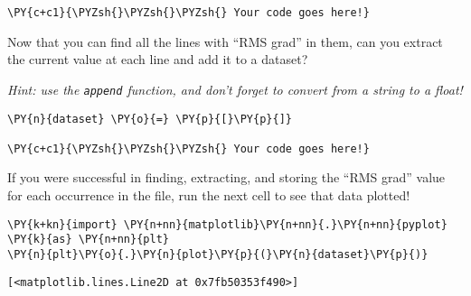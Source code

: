     \begin{tcolorbox}[breakable, size=fbox, boxrule=1pt, pad at break*=1mm,colback=cellbackground, colframe=cellborder]
\begin{Verbatim}[commandchars=\\\{\}]
\PY{c+c1}{\PYZsh{}\PYZsh{}\PYZsh{} Your code goes here!}
\end{Verbatim}
\end{tcolorbox}

    Now that you can find all the lines with ``RMS grad'' in them, can you
extract the current value at each line and add it to a dataset?

\emph{Hint: use the \texttt{append} function, and don't forget to
convert from a string to a float!}

    \begin{tcolorbox}[breakable, size=fbox, boxrule=1pt, pad at break*=1mm,colback=cellbackground, colframe=cellborder]
\begin{Verbatim}[commandchars=\\\{\}]
\PY{n}{dataset} \PY{o}{=} \PY{p}{[}\PY{p}{]}

\PY{c+c1}{\PYZsh{}\PYZsh{}\PYZsh{} Your code goes here!}
\end{Verbatim}
\end{tcolorbox}

    If you were successful in finding, extracting, and storing the ``RMS
grad'' value for each occurrence in the file, run the next cell to see
that data plotted!

    \begin{tcolorbox}[breakable, size=fbox, boxrule=1pt, pad at break*=1mm,colback=cellbackground, colframe=cellborder]
\begin{Verbatim}[commandchars=\\\{\}]
\PY{k+kn}{import} \PY{n+nn}{matplotlib}\PY{n+nn}{.}\PY{n+nn}{pyplot} \PY{k}{as} \PY{n+nn}{plt}
\PY{n}{plt}\PY{o}{.}\PY{n}{plot}\PY{p}{(}\PY{n}{dataset}\PY{p}{)}
\end{Verbatim}
\end{tcolorbox}

            \begin{tcolorbox}[breakable, size=fbox, boxrule=.5pt, pad at break*=1mm, opacityfill=0]
\begin{Verbatim}[commandchars=\\\{\}]
[<matplotlib.lines.Line2D at 0x7fb50353f490>]
\end{Verbatim}
\end{tcolorbox}
        
